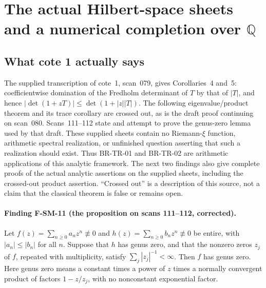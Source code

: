 \section{The actual Hilbert-space sheets and a numerical completion over \texorpdfstring{$\mathbb Q$}{Q}}
\label{sec:masullo-numeric}

\subsection{What cote 1 actually says}

The supplied transcription of cote~1, scan~079, gives Corollaries~4 and~5:
coefficientwise domination of the Fredholm determinant of $T$ by that of
$|T|$, and hence $|\det(1+zT)|\leq\det(1+|z||T|)$.  The following
eigenvalue/product theorem and its trace corollary are crossed out, as is the
draft proof continuing on scan~080.  Scans~111--112 state and attempt to prove
the genus-zero lemma used by that draft.  These supplied sheets contain no
Riemann-$\xi$ function, arithmetic spectral realization, or unfinished question
asserting that such a realization should exist.  Thus BR-TR-01 and BR-TR-02
are arithmetic applications of this analytic framework.  The next two
findings also give complete proofs of the actual analytic assertions on the
supplied sheets, including the crossed-out product assertion.  ``Crossed
out'' is a description of this source, not a claim that the classical theorem
is false or remains open.

\paragraph{Finding F-SM-11 (the proposition on scans 111--112, corrected).}
Let $f(z)=\sum_{n\geq0}a_nz^n\not\equiv0$ and
$h(z)=\sum_{n\geq0}b_nz^n\not\equiv0$ be entire, with
$|a_n|\leq|b_n|$ for all $n$.  Suppose that $h$ has genus zero, and that the
nonzero zeros $z_j$ of $f$, repeated with multiplicity, satisfy
$\sum_j|z_j|^{-1}<\infty$.  Then $f$ has genus zero.  Here genus zero means
a constant times a power of $z$ times a normally convergent product of
factors $1-z/z_j$, with no nonconstant exponential factor.

